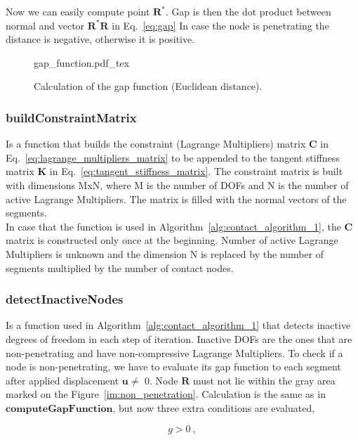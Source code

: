\documentclass[10pt,a4paper]{article}
\begin{document}
Now we can easily compute point $\mathbf{R}^*$. Gap is then the dot product between normal and vector $\mathbf{R}^*\mathbf{R}$ in Eq.~\eqref{eq:gap} In case the node is penetrating the distance is negative, otherwise it is positive.

\begin{figure}[ht]
	\centering
	\footnotesize
    \def\svgwidth{0.85\textwidth}{gap_function.pdf_tex}
	\caption{Calculation of the gap function (Euclidean distance).}
	\label{im:gap_function}
\end{figure}

\subsubsection{buildConstraintMatrix}

Is a function that builds the constraint (Lagrange Multipliers) matrix $\mathbf{C}$ in Eq.~\eqref{eq:lagrange_multipliers_matrix} to be appended to the tangent stiffness matrix $\mathbf{K}$ in Eq.~\eqref{eq:tangent_stiffness_matrix}. The constraint matrix is built with dimensions MxN, where M is the number of DOFs and N is the number of active Lagrange Multipliers. The matrix is filled with the normal vectors of the segments. \\

In case that the function is used in Algorithm~\ref{alg:contact_algorithm_1}, the $\mathbf{C}$ matrix is constructed only once at the beginning. Number of active Lagrange Multipliers is unknown and the dimension N is replaced by the number of segments multiplied by the number of contact nodes.

\subsubsection{detectInactiveNodes}

Is a function used in Algorithm~\ref{alg:contact_algorithm_1} that detects inactive degrees of freedom in each step of iteration. Inactive DOFs are the ones that are non-penetrating and have non-compressive Lagrange Multipliers. To check if a node is non-penetrating, we have to evaluate its gap function to each segment after applied displacement $\mathbf{u \ne}$ 0. Node $\mathbf{R}$ must not lie within the gray area marked on the Figure~\ref{im:non_penetration}. Calculation is the same as in $\textbf{computeGapFunction}$, but now three extra conditions are evaluated,

\begin{equation}
	g > 0  \:,
	\label{eq:n_penetration}
\end{equation}
\end{document}
